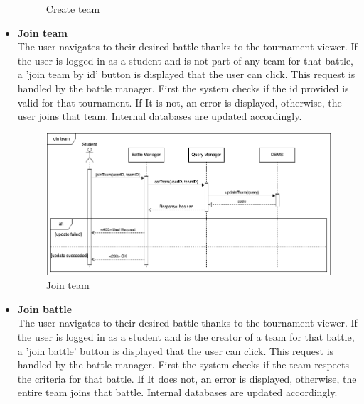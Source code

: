 \begin{itemize}
\begin{figure}[h]
        \caption{Create team}
        \label{fig:Create team}
    \end{figure}
    \newpage
    \item \textbf{Join team}\\
    The user navigates to their desired battle thanks to the tournament viewer. If the user is logged in as a student and is not part of any team for that battle, a 'join team by id' 
    button is displayed that the user 
    can click. This request is handled by the battle manager. First the system checks if the id provided is valid for that tournament. If It is not, an error is displayed, otherwise, 
    the user joins that team. Internal databases are updated accordingly.
    \begin{figure}[h]
        \centering
        \includegraphics[width=1\linewidth]{src/Join team.png}
        \caption{Join team}
        \label{fig:Join team}
    \end{figure}
    \newpage
    \item \textbf{Join battle}\\
    The user navigates to their desired battle thanks to the tournament viewer. If the user is logged in as a student and is the creator of a team for that battle, a 'join battle' 
    button is displayed that the user can click. 
    This request is handled by the battle manager. First the system checks if the team respects the criteria for that battle. If It does not, an error is displayed, otherwise, 
    the entire team joins that battle. Internal databases are updated accordingly.
    \begin{figure}[h]
        \centering

\end{figure}
\end{itemize}
